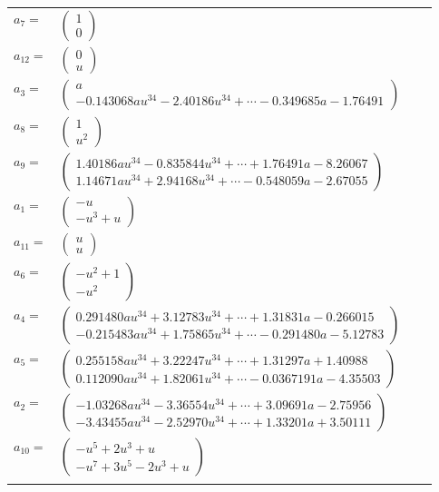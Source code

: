 \documentclass[1p]{elsarticle_modified}
\theoremstyle{definition}
\begin{document}
\begin{tabular}{m{7pt} m{180pt} m{7pt} m{180pt} }
\flushright $a_{7}=$&$\begin{pmatrix}1\\0\end{pmatrix}$ \\
\flushright $a_{12}=$&$\begin{pmatrix}0\\u\end{pmatrix}$ \\
\flushright $a_{3}=$&$\begin{pmatrix}a\\-0.143068 a u^{34}-2.40186 u^{34}+\cdots-0.349685 a-1.76491\end{pmatrix}$ \\
\flushright $a_{8}=$&$\begin{pmatrix}1\\u^2\end{pmatrix}$ \\
\flushright $a_{9}=$&$\begin{pmatrix}1.40186 a u^{34}-0.835844 u^{34}+\cdots+1.76491 a-8.26067\\1.14671 a u^{34}+2.94168 u^{34}+\cdots-0.548059 a-2.67055\end{pmatrix}$ \\
\flushright $a_{1}=$&$\begin{pmatrix}- u\\- u^3+u\end{pmatrix}$ \\
\flushright $a_{11}=$&$\begin{pmatrix}u\\u\end{pmatrix}$ \\
\flushright $a_{6}=$&$\begin{pmatrix}- u^2+1\\- u^2\end{pmatrix}$ \\
\flushright $a_{4}=$&$\begin{pmatrix}0.291480 a u^{34}+3.12783 u^{34}+\cdots+1.31831 a-0.266015\\-0.215483 a u^{34}+1.75865 u^{34}+\cdots-0.291480 a-5.12783\end{pmatrix}$ \\
\flushright $a_{5}=$&$\begin{pmatrix}0.255158 a u^{34}+3.22247 u^{34}+\cdots+1.31297 a+1.40988\\0.112090 a u^{34}+1.82061 u^{34}+\cdots-0.0367191 a-4.35503\end{pmatrix}$ \\
\flushright $a_{2}=$&$\begin{pmatrix}-1.03268 a u^{34}-3.36554 u^{34}+\cdots+3.09691 a-2.75956\\-3.43455 a u^{34}-2.52970 u^{34}+\cdots+1.33201 a+3.50111\end{pmatrix}$ \\
\flushright $a_{10}=$&$\begin{pmatrix}- u^5+2 u^3+u\\- u^7+3 u^5-2 u^3+u\end{pmatrix}$\\&\end{tabular}
\end{document}
